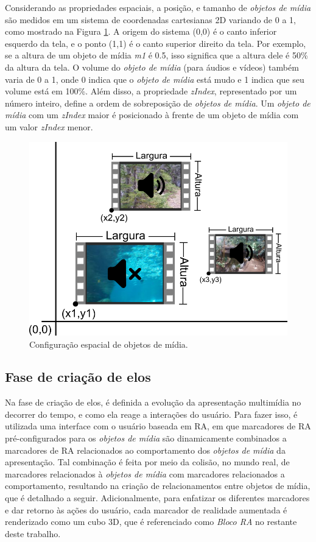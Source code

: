 \documentclass[../main.tex]{subfiles}
\begin{document}
Considerando as propriedades espaciais, a posição, e tamanho de \emph{objetos de mídia} são medidos em um sistema de coordenadas cartesianas 2D variando de 0 a 1, como mostrado na Figura \ref{fig:cartesiano}. A origem do sistema (0,0) é o canto inferior esquerdo da tela, e o ponto (1,1) é o canto superior direito da tela. Por exemplo, se a altura de um objeto de mídia \emph{m1} é 0.5, isso significa que a altura dele é 50\% da altura da tela.  O volume do \emph{objeto de mídia} (para áudios e vídeos) também varia de 0 a 1, onde 0 indica que o \emph{objeto de mídia} está mudo e 1 indica que seu volume está em 100\%. Além disso, a propriedade \emph{zIndex}, representado por um número inteiro, define a ordem de sobreposição de \emph{objetos de mídia}. Um \emph{objeto de mídia} com um \emph{zIndex} maior é posicionado à frente de um objeto de mídia com um valor \emph{zIndex} menor.

\begin{figure}[!h]
\centering
\includegraphics[width=0.7\linewidth]{IMG/media_config.png}
\caption{Configuração espacial de objetos de mídia.}
\label{fig:cartesiano}
\end{figure}

\subsection{Fase de criação de elos}
\label{subsec:criacao_elos}

Na fase de criação de elos, é definida a evolução da apresentação multimídia no decorrer do tempo, e como ela reage a interações do usuário. Para fazer isso, é utilizada uma interface com o usuário baseada em RA, em que marcadores de RA pré-configurados para os \emph{objetos de mídia} são dinamicamente combinados a marcadores de RA relacionados ao comportamento dos \emph{objetos de mídia} da apresentação. Tal combinação é feita por meio da colisão, no mundo real, de marcadores relacionados à \emph{objetos de mídia} com marcadores relacionados a comportamento, resultando na criação de relacionamentos entre objetos de mídia, que é detalhado a seguir. Adicionalmente, para enfatizar os diferentes marcadores e dar retorno às ações do usuário, cada marcador de realidade aumentada é renderizado como um cubo 3D, que é referenciado como \emph{Bloco RA} no restante deste trabalho.
\end{document}
